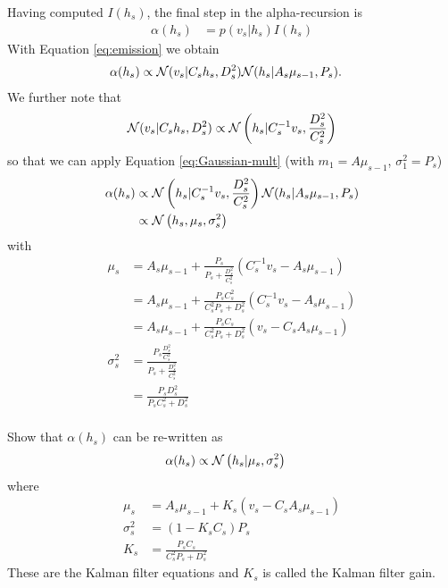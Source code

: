\begin{exenumerate}
  \begin{solution}
    Having computed $I(h_s)$, the final step in the alpha-recursion is
    \begin{align}
      \alpha(h_s) & = p(v_s | h_s) I(h_s)
    \end{align}
    With Equation \eqref{eq:emission} we obtain
    \begin{align}
      \alpha(h_s) & \propto \mathcal{N}(v_s | C_s h_s, D^2_s)  \mathcal{N}(h_s | A_s \mu_{s-1}, P_s).
    \end{align}
    We further note that
    \begin{align}
      \mathcal{N}(v_s | C_s h_s, D_s^2) \propto \mathcal{N} \left(h_s | C_s^{-1}
      v_s, \frac{D_s^2}{C_s^2}\right)
    \end{align}
    so that we can apply Equation \eqref{eq:Gaussian-mult} (with $m_1=A \mu_{s-1}$, $\sigma_1^2 = P_s$)
    \begin{align}
      \alpha(h_s) & \propto  \mathcal{N}\left(h_s | C_s^{-1} v_s, \frac{D_s^2}{C_s^2}\right) \mathcal{N}(h_s | A_s \mu_{s-1}, P_s)\\
      & \propto \mathcal{N}\left(h_s, \mu_s, \sigma_s^2\right)
    \end{align}
    with
    \begin{align}
      \mu_s & =  A_s \mu_{s-1} + \frac{P_s}{P_s+ \frac{D_s^2}{C_s^2}}\left(C_s^{-1} v_s - A_s \mu_{s-1}\right)\\
            & =  A_s \mu_{s-1} + \frac{P_sC_s^2}{C_s^2 P_s+ D_s^2}\left(C_s^{-1}v_s - A_s \mu_{s-1}\right)\\
      & =  A_s \mu_{s-1} + \frac{P_sC_s}{C_s^2 P_s+ D_s^2}\left(v_s - C_s A_s \mu_{s-1}\right)\\
      \sigma^2_s & = \frac{P_s \frac{D_s^2}{C_s^2}}{P_s+ \frac{D_s^2}{C_s^2}}\\
      & =  \frac{P_s D_s^2}{P_s C_s^2+ D_s^2}\\
    \end{align}
  \end{solution}
  
  \item Show that $\alpha(h_s)$ can be re-written as
     \begin{align}
    \alpha(h_s) & \propto \mathcal{N}\left(h_s | \mu_s , \sigma_s^2\right)
     \end{align}
     where
     \begin{align}
       \mu_s & = A_s \mu_{s-1} + K_s \left(v_s - C_s A_s \mu_{s-1}\right) \label{eq:mu-def}\\
       \sigma_s^2 & = (1-K_sC_s)P_s\\
       K_s & = \frac{P_s C_s}{C_s^2 P_s + D_s^2}
     \end{align}
     These are the Kalman filter equations and $K_s$ is called the Kalman filter gain.


\end{exenumerate}
